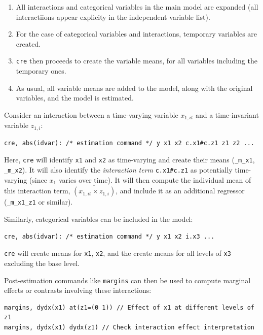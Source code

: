 \documentclass[bib]{statapress}
\providecommand{\tightlist}{%
  \setlength{\itemsep}{0pt}\setlength{\parskip}{0pt}}\usepackage{longtable,booktabs,array}
\begin{document}
\begin{enumerate}
\def\labelenumi{\arabic{enumi}.}
\tightlist
\item
  All interactions and categorical variables in the main model are
  expanded (all interactiions appear explicity in the independent
  variable list).
\item
  For the case of categorical variables and interactions, temporary
  variables are created.
\item
  \texttt{cre} then proceeds to create the variable means, for all
  variables including the temporary ones.
\item
  As usual, all variable means are added to the model, along with the
  original variables, and the model is estimated.
\end{enumerate}

Consider an interaction between a time-varying variable \(x_{1,it}\) and
a time-invariant variable \(z_{1,i}\):

\begin{verbatim}
cre, abs(idvar): /* estimation command */ y x1 x2 c.x1#c.z1 z1 z2 ...
\end{verbatim}

Here, \texttt{cre} will identify \texttt{x1} and \texttt{x2} as
time-varying and create their means (\texttt{\_m\_x1},
\texttt{\_m\_x2}). It will also identify the \emph{interaction term}
\texttt{c.x1\#c.z1} as potentially time-varying (since \(x_1\) varies
over time). It will then compute the individual mean of this interaction
term, \(\overline{(x_{1,it} \times z_{1,i})}\), and include it as an
additional regressor (\texttt{\_m\_x1\_z1} or similar).

Similarly, categorical variables can be included in the model:

\begin{verbatim}
cre, abs(idvar): /* estimation command */ y x1 x2 i.x3 ...
\end{verbatim}

\texttt{cre} will create means for \texttt{x1}, \texttt{x2}, and the
create means for all levels of \texttt{x3} excluding the base level.

Post-estimation commands like \texttt{margins} can then be used to
compute marginal effects or contrasts involving these interactions:

\begin{verbatim}
margins, dydx(x1) at(z1=(0 1)) // Effect of x1 at different levels of z1
margins, dydx(x1) dydx(z1) // Check interaction effect interpretation
\end{verbatim}
\end{document}
